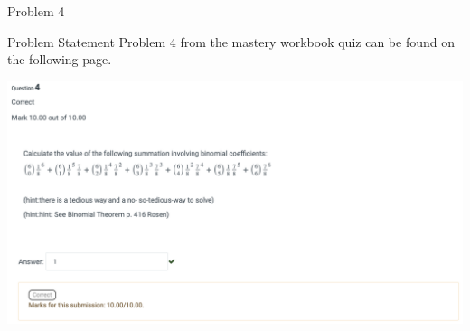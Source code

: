 \begin{problem}{Problem 4}
    \begin{statement}{Problem Statement}
        Problem 4 from the mastery workbook quiz can be found on the following page.
    \end{statement}
    \begin{Highlight}[Solution]
        \begin{center}
            \includegraphics[width = 1.0\textwidth]{Images/Problem 4.png}
        \end{center}
    \end{Highlight}
\end{problem}

